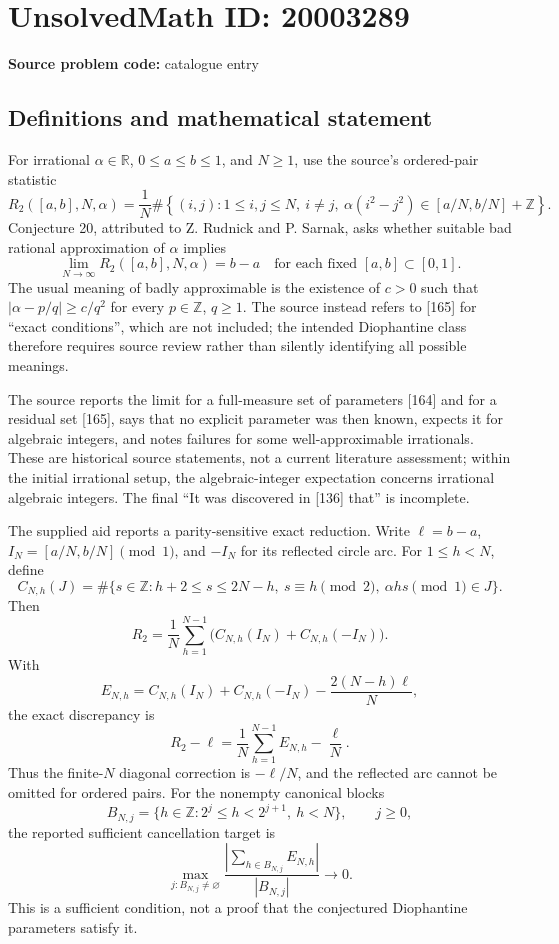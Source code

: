 \documentclass[11pt]{article}
\newcommand{\Z}{\mathbb{Z}}
\newcommand{\R}{\mathbb{R}}
\begin{document}
\section*{UnsolvedMath ID: 20003289}
\textbf{Source problem code:} catalogue entry
\subsection{Definitions and mathematical statement}
For irrational $\alpha\in\R$, $0\le a\le b\le1$, and $N\ge1$, use the source's ordered-pair statistic
\[
 R_2([a,b],N,\alpha)=\frac1N\#\left\{(i,j):1\le i,j\le N,\ i\ne j,
 \ \alpha(i^2-j^2)\in[a/N,b/N]+\Z\right\}.
\]
Conjecture 20, attributed to Z. Rudnick and P. Sarnak, asks whether suitable bad rational approximation of $\alpha$ implies
\[
 \lim_{N\to\infty}R_2([a,b],N,\alpha)=b-a
 \quad\text{for each fixed }[a,b]\subset[0,1].
\]
The usual meaning of badly approximable is the existence of $c>0$ such that $|\alpha-p/q|\ge c/q^2$ for every $p\in\Z$, $q\ge1$. The source instead refers to [165] for ``exact conditions'', which are not included; the intended Diophantine class therefore requires source review rather than silently identifying all possible meanings.

The source reports the limit for a full-measure set of parameters [164] and for a residual set [165], says that no explicit parameter was then known, expects it for algebraic integers, and notes failures for some well-approximable irrationals. These are historical source statements, not a current literature assessment; within the initial irrational setup, the algebraic-integer expectation concerns irrational algebraic integers. The final ``It was discovered in [136] that'' is incomplete.

The supplied aid reports a parity-sensitive exact reduction. Write $\ell=b-a$, $I_N=[a/N,b/N]\pmod1$, and $-I_N$ for its reflected circle arc. For $1\le h<N$, define
\[
 C_{N,h}(J)=\#\{s\in\Z:h+2\le s\le2N-h,\ s\equiv h\pmod2,
                    \ \alpha h s\pmod1\in J\}.
\]
Then
\[
 R_2=\frac1N\sum_{h=1}^{N-1}\bigl(C_{N,h}(I_N)+C_{N,h}(-I_N)\bigr).
\]
With
\[
 E_{N,h}=C_{N,h}(I_N)+C_{N,h}(-I_N)-\frac{2(N-h)\ell}{N},
\]
the exact discrepancy is
\[
 R_2-\ell=\frac1N\sum_{h=1}^{N-1}E_{N,h}-\frac{\ell}{N}.
\]
Thus the finite-$N$ diagonal correction is $-\ell/N$, and the reflected arc cannot be omitted for ordered pairs. For the nonempty canonical blocks
\[
 B_{N,j}=\{h\in\Z:2^j\le h<2^{j+1},\ h<N\},\qquad j\ge0,
\]
the reported sufficient cancellation target is
\[
 \max_{j:B_{N,j}\ne\varnothing}
 \frac{\left|\sum_{h\in B_{N,j}}E_{N,h}\right|}{|B_{N,j}|}
 \longrightarrow0.
\]
This is a sufficient condition, not a proof that the conjectured Diophantine parameters satisfy it.
\end{document}
